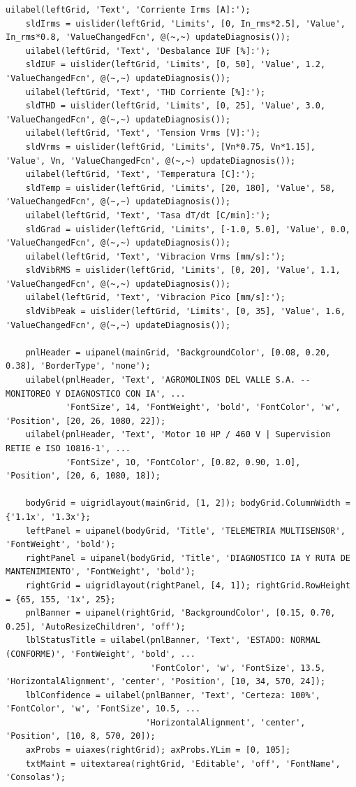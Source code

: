\documentclass[conference]{IEEEtran}
\begin{document}
\begin{lstlisting}[caption={Panel de control y despacho predictivo (\texttt{MotorFaultDiagnosticGUI.m})}, label={lst:gui}]
    uilabel(leftGrid, 'Text', 'Corriente Irms [A]:');
    sldIrms = uislider(leftGrid, 'Limits', [0, In_rms*2.5], 'Value', In_rms*0.8, 'ValueChangedFcn', @(~,~) updateDiagnosis());
    uilabel(leftGrid, 'Text', 'Desbalance IUF [%]:');
    sldIUF = uislider(leftGrid, 'Limits', [0, 50], 'Value', 1.2, 'ValueChangedFcn', @(~,~) updateDiagnosis());
    uilabel(leftGrid, 'Text', 'THD Corriente [%]:');
    sldTHD = uislider(leftGrid, 'Limits', [0, 25], 'Value', 3.0, 'ValueChangedFcn', @(~,~) updateDiagnosis());
    uilabel(leftGrid, 'Text', 'Tension Vrms [V]:');
    sldVrms = uislider(leftGrid, 'Limits', [Vn*0.75, Vn*1.15], 'Value', Vn, 'ValueChangedFcn', @(~,~) updateDiagnosis());
    uilabel(leftGrid, 'Text', 'Temperatura [C]:');
    sldTemp = uislider(leftGrid, 'Limits', [20, 180], 'Value', 58, 'ValueChangedFcn', @(~,~) updateDiagnosis());
    uilabel(leftGrid, 'Text', 'Tasa dT/dt [C/min]:');
    sldGrad = uislider(leftGrid, 'Limits', [-1.0, 5.0], 'Value', 0.0, 'ValueChangedFcn', @(~,~) updateDiagnosis());
    uilabel(leftGrid, 'Text', 'Vibracion Vrms [mm/s]:');
    sldVibRMS = uislider(leftGrid, 'Limits', [0, 20], 'Value', 1.1, 'ValueChangedFcn', @(~,~) updateDiagnosis());
    uilabel(leftGrid, 'Text', 'Vibracion Pico [mm/s]:');
    sldVibPeak = uislider(leftGrid, 'Limits', [0, 35], 'Value', 1.6, 'ValueChangedFcn', @(~,~) updateDiagnosis());

    pnlHeader = uipanel(mainGrid, 'BackgroundColor', [0.08, 0.20, 0.38], 'BorderType', 'none');
    uilabel(pnlHeader, 'Text', 'AGROMOLINOS DEL VALLE S.A. -- MONITOREO Y DIAGNOSTICO CON IA', ...
            'FontSize', 14, 'FontWeight', 'bold', 'FontColor', 'w', 'Position', [20, 26, 1080, 22]);
    uilabel(pnlHeader, 'Text', 'Motor 10 HP / 460 V | Supervision RETIE e ISO 10816-1', ...
            'FontSize', 10, 'FontColor', [0.82, 0.90, 1.0], 'Position', [20, 6, 1080, 18]);

    bodyGrid = uigridlayout(mainGrid, [1, 2]); bodyGrid.ColumnWidth = {'1.1x', '1.3x'};
    leftPanel = uipanel(bodyGrid, 'Title', 'TELEMETRIA MULTISENSOR', 'FontWeight', 'bold');
    rightPanel = uipanel(bodyGrid, 'Title', 'DIAGNOSTICO IA Y RUTA DE MANTENIMIENTO', 'FontWeight', 'bold');
    rightGrid = uigridlayout(rightPanel, [4, 1]); rightGrid.RowHeight = {65, 155, '1x', 25};
    pnlBanner = uipanel(rightGrid, 'BackgroundColor', [0.15, 0.70, 0.25], 'AutoResizeChildren', 'off');
    lblStatusTitle = uilabel(pnlBanner, 'Text', 'ESTADO: NORMAL (CONFORME)', 'FontWeight', 'bold', ...
                             'FontColor', 'w', 'FontSize', 13.5, 'HorizontalAlignment', 'center', 'Position', [10, 34, 570, 24]);
    lblConfidence = uilabel(pnlBanner, 'Text', 'Certeza: 100%', 'FontColor', 'w', 'FontSize', 10.5, ...
                            'HorizontalAlignment', 'center', 'Position', [10, 8, 570, 20]);
    axProbs = uiaxes(rightGrid); axProbs.YLim = [0, 105];
    txtMaint = uitextarea(rightGrid, 'Editable', 'off', 'FontName', 'Consolas');


\end{lstlisting}
\end{document}
